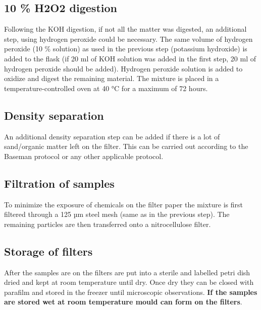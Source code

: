\documentclass[
  icelandic,
]{book}
\begin{document}
\hypertarget{h2o2-digestion}{%
\subsection{10 \% H2O2 digestion}\label{h2o2-digestion}}

Following the KOH digestion, if not all the matter was digested, an additional step, using hydrogen peroxide could be necessary. The same volume of hydrogen peroxide (10 \% solution) as used in the previous step (potassium hydroxide) is added to the flask (if 20 ml of KOH solution was added in the first step, 20 ml of hydrogen peroxide should be added). Hydrogen peroxide solution is added to oxidize and digest the remaining material. The mixture is placed in a temperature-controlled oven at 40 °C for a maximum of 72 hours.

\hypertarget{density-separation}{%
\subsection{Density separation}\label{density-separation}}

An additional density separation step can be added if there is a lot of sand/organic matter left on the filter. This can be carried out according to the Baseman protocol or any other applicable protocol.

\hypertarget{filtration-of-samples}{%
\subsection{Filtration of samples}\label{filtration-of-samples}}

To minimize the exposure of chemicals on the filter paper the mixture is first filtered through a 125 µm steel mesh (same as in the previous step). The remaining particles are then transferred onto a nitrocellulose filter.

\hypertarget{storage-of-filters}{%
\subsection{Storage of filters}\label{storage-of-filters}}

After the samples are on the filters are put into a sterile and labelled petri dish dried and kept at room temperature until dry. Once dry they can be closed with parafilm and stored in the freezer until microscopic observations. \textbf{If the samples are stored wet at room temperature mould can form on the filters}.
\end{document}
